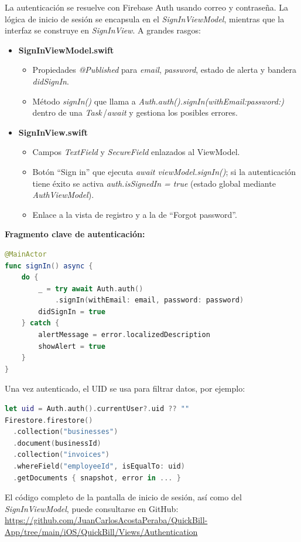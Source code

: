 \begin{large}

La autenticación se resuelve con Firebase Auth usando correo y contraseña. La lógica de inicio de sesión se  encapsula en el \textit{SignInViewModel}, mientras que la interfaz se construye en \textit{SignInView}. A grandes rasgos:

\begin{itemize}
  \item \textbf{SignInViewModel.swift}
    \begin{itemize}
      \item Propiedades \textit{@Published} para \textit{email}, \textit{password}, estado de alerta y bandera \textit{didSignIn}.
      \item Método \textit{signIn()} que llama a \textit{Auth.auth().signIn(withEmail:password:)} dentro de una \textit{Task}\,/\textit{await} y gestiona los posibles errores.
    \end{itemize}
  \item \textbf{SignInView.swift}
    \begin{itemize}
      \item Campos \textit{TextField} y \textit{SecureField} enlazados al ViewModel.
      \item Botón “Sign in” que ejecuta \textit{await viewModel.signIn()}; si la autenticación tiene éxito se activa \textit{auth.isSignedIn = true} (estado global mediante \textit{AuthViewModel}).
      \item Enlace a la vista de registro y a la de “Forgot password”.
    \end{itemize}
\end{itemize}

\noindent\textbf{Fragmento clave de autenticación:}
\begin{lstlisting}[language=swift, basicstyle=\ttfamily\small, caption={SignInViewModel.signIn()}]
@MainActor
func signIn() async {
    do {
        _ = try await Auth.auth()
            .signIn(withEmail: email, password: password)
        didSignIn = true
    } catch {
        alertMessage = error.localizedDescription
        showAlert = true
    }
}
\end{lstlisting}

\noindent Una vez autenticado, el UID se usa para filtrar datos, por ejemplo:

\begin{lstlisting}[language=swift, basicstyle=\ttfamily\small]
let uid = Auth.auth().currentUser?.uid ?? ""
Firestore.firestore()
  .collection("businesses")
  .document(businessId)
  .collection("invoices")
  .whereField("employeeId", isEqualTo: uid)
  .getDocuments { snapshot, error in ... }
\end{lstlisting}

El código completo de la pantalla de inicio de sesión, así como del \textit{SignInViewModel}, puede consultarse en GitHub:
\url{https://github.com/JuanCarlosAcostaPeraba/QuickBill-App/tree/main/iOS/QuickBill/Views/Authentication}

\end{large}


